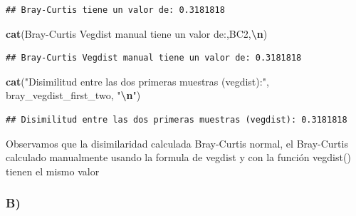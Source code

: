 \documentclass[
]{article}
\newenvironment{Shaded}{\begin{snugshade}}{\end{snugshade}}
\newcommand{\FunctionTok}[1]{\textcolor[rgb]{0.13,0.29,0.53}{\textbf{#1}}}
\newcommand{\NormalTok}[1]{#1}
\newcommand{\SpecialCharTok}[1]{\textcolor[rgb]{0.81,0.36,0.00}{\textbf{#1}}}
\newcommand{\StringTok}[1]{\textcolor[rgb]{0.31,0.60,0.02}{#1}}
\begin{document}
\begin{verbatim}
## Bray-Curtis tiene un valor de: 0.3181818
\end{verbatim}

\begin{Shaded}
\begin{Highlighting}[]
\FunctionTok{cat}\NormalTok{(}\StringTok{\textquotesingle{}Bray{-}Curtis Vegdist manual tiene un valor de:\textquotesingle{}}\NormalTok{,BC2,}\StringTok{\textquotesingle{}}\SpecialCharTok{\textbackslash{}n}\StringTok{\textquotesingle{}}\NormalTok{)}
\end{Highlighting}
\end{Shaded}

\begin{verbatim}
## Bray-Curtis Vegdist manual tiene un valor de: 0.3181818
\end{verbatim}

\begin{Shaded}
\begin{Highlighting}[]
\FunctionTok{cat}\NormalTok{(}\StringTok{"Disimilitud entre las dos primeras muestras (vegdist):"}\NormalTok{, bray\_vegdist\_first\_two, }\StringTok{"}\SpecialCharTok{\textbackslash{}n}\StringTok{"}\NormalTok{)}
\end{Highlighting}
\end{Shaded}

\begin{verbatim}
## Disimilitud entre las dos primeras muestras (vegdist): 0.3181818
\end{verbatim}

Observamos que la disimilaridad calculada Bray-Curtis normal, el
Bray-Curtis calculado manualmente usando la formula de vegdist y con la
función vegdist() tienen el mismo valor

\hypertarget{b-1}{%
\subsubsection{B)}\label{b-1}}
\end{document}
